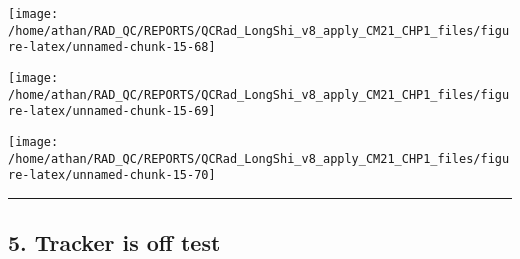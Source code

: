 \documentclass[
  10pt,
  a4paper,oneside]{article}
\begin{document}
\begin{center}\texttt{[image: /home/athan/RAD\_QC/REPORTS/QCRad\_LongShi\_v8\_apply\_CM21\_CHP1\_files/figure-latex/unnamed-chunk-15-68]} \end{center}

\begin{center}\texttt{[image: /home/athan/RAD\_QC/REPORTS/QCRad\_LongShi\_v8\_apply\_CM21\_CHP1\_files/figure-latex/unnamed-chunk-15-69]} \end{center}

\begin{center}\texttt{[image: /home/athan/RAD\_QC/REPORTS/QCRad\_LongShi\_v8\_apply\_CM21\_CHP1\_files/figure-latex/unnamed-chunk-15-70]} \end{center}

\begin{center}\rule{0.5\linewidth}{0.5pt}\end{center}

\newpage

\hypertarget{tracker-is-off-test}{%
\subsection{5. Tracker is off test}\label{tracker-is-off-test}}
\end{document}
